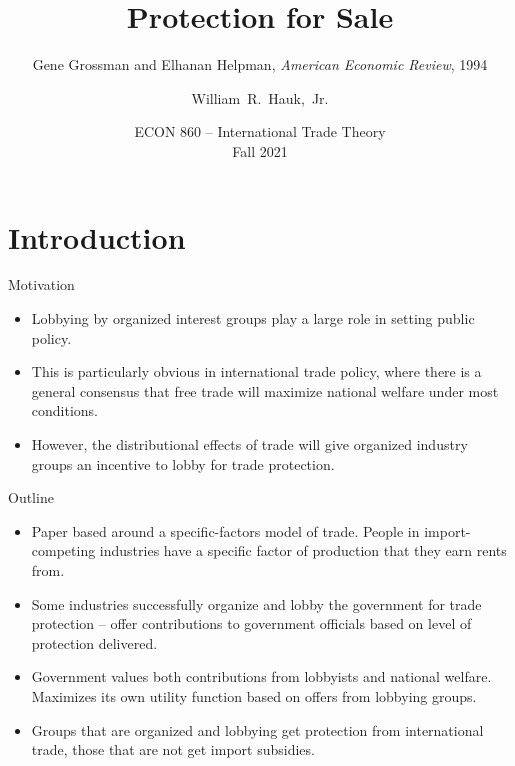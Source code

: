 \documentclass[aspectratio=169]{beamer}
\title[Grossman and Helpman (1994)] %
{Protection for Sale}
\subtitle{Gene Grossman and Elhanan Helpman, \emph{American Economic Review}, 1994}
\author [Hauk] %
{William~R.~Hauk,~Jr.} %
\institute[UofSC] %
{
  Darla Moore School of Business\\
  University of South Carolina
}
\date[ECON 860, Fall 2021] %
{ECON 860 -- International Trade Theory\\Fall 2021}
\begin{document}
\frame{\titlepage}


\section{Introduction}


\begin{frame}{Motivation}

\begin{itemize}
    \item<1-> Lobbying by organized interest groups play a large role in setting public policy.
    \item<2-> This is particularly obvious in international trade policy, where there is a general consensus that free trade will maximize national welfare under most conditions.
    \item<3-> However, the distributional effects of trade will give organized industry groups an incentive to lobby for trade protection.
\end{itemize}
    
\end{frame}


\begin{frame}{Outline}

\begin{itemize}
    \item<1-> Paper based around a specific-factors model of trade.  People in import-competing industries have a specific factor of production that they earn rents from.
    \item<2->  Some industries successfully organize and lobby the government for trade protection – offer contributions to government officials based on level of protection delivered.
    \item<3-> Government values both contributions from lobbyists and national welfare.  Maximizes its own utility function based on offers from lobbying groups.
    \item<4-> Groups that are organized and lobbying get protection from international trade, those that are not get import subsidies.
\end{itemize}
    
\end{frame}
\end{document}
